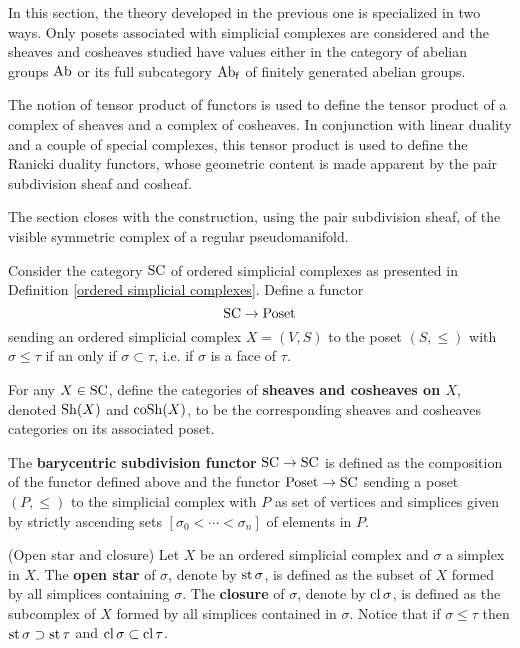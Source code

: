 \documentclass[main.tex]{subfiles}
\begin{document}
In this section, the theory developed in the previous one is specialized in two ways. Only posets associated with simplicial complexes are considered and the sheaves and cosheaves studied have values either in the category of abelian groups $\operatorname{Ab}$ or its full subcategory $\operatorname{Ab}_{\mathsf{f}}$ of finitely generated abelian groups.

The notion of tensor product of functors is used to define the tensor product of a complex of sheaves and a complex of cosheaves. In conjunction with linear duality and a couple of special complexes, this tensor product is used to define the Ranicki duality functors, whose geometric content is made apparent by the pair subdivision sheaf and cosheaf.

The section closes with the construction, using the pair subdivision sheaf, of the visible symmetric complex of a regular pseudomanifold.

\begin{defn}\label{Posets <-- SC}
Consider the category $\operatorname{SC}$ of ordered simplicial complexes as presented in Definition \ref{ordered simplicial complexes}. Define a functor $$\operatorname{SC}\to\operatorname{Poset}$$ sending an ordered simplicial complex $X=(V,S)$ to the poset $(S,\leq)$ with $\sigma\leq\tau$ if an only if $\sigma\subset\tau$, i.e. if $\sigma$ is a face of $\tau$.

For any $X\in\operatorname{SC}$, define the categories of \textbf{sheaves and cosheaves on $X$}, denoted $\operatorname{Sh}(X)$ and $\operatorname{coSh}(X)$, to be the corresponding sheaves and cosheaves categories on its associated poset.

The \textbf{barycentric subdivision functor} $\operatorname{SC}\to\operatorname{SC}$ is defined as the composition of the functor defined above and the functor $\operatorname{Poset}\to\operatorname{SC}$ sending a poset $(P,\leq)$ to the simplicial complex with $P$ as set of vertices and simplices given by strictly ascending sets $[\sigma_0<\dotsb<\sigma_n]$ of elements in $P$.
\end{defn}

\begin{defn}(Open star and closure)
Let $X$ be an ordered simplicial complex and $\sigma$ a simplex in $X$. The \textbf{open star} of $\sigma$, denote by $\operatorname{st}\sigma$, is defined as the subset of $X$ formed by all simplices containing $\sigma$. The \textbf{closure} of $\sigma$, denote by $\operatorname{cl}\sigma$, is defined as the subcomplex of $X$ formed by all simplices contained in $\sigma$. Notice that if $\sigma\leq\tau$ then $\operatorname{st}\sigma\supset\operatorname{st}\tau$ and $\operatorname{cl}\sigma\subset\operatorname{cl}\tau$.
\end{defn}
\end{document}
